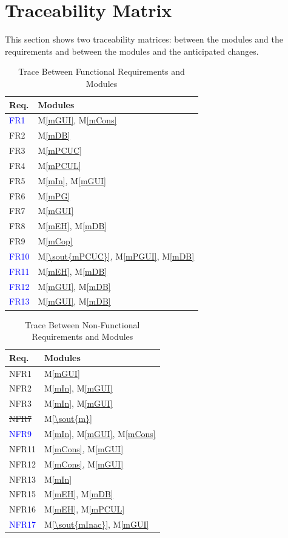 \documentclass[12pt, titlepage]{article}
\newcommand{\mref}[1]{M\ref{#1}}
\begin{document}
\section{Traceability Matrix} \label{SecTM}

This section shows two traceability matrices: between the modules and the
requirements and between the modules and the anticipated changes.

\begin{table}[H]
\centering
\begin{tabular}{p{} p{}}
\toprule
\textbf{Req.} & \textbf{Modules}\\
\midrule
\textcolor{blue}{FR1} & \mref{mGUI}, \mref{mCons}\\
FR2 & \mref{mDB}\\
FR3 & \mref{mPCUC}\\
FR4 & \mref{mPCUL}\\
FR5 & \mref{mIn}, \mref{mGUI}\\
FR6 & \mref{mPG}\\
FR7 & \mref{mGUI}\\
FR8 & \mref{mEH}, \mref{mDB}\\
FR9 & \mref{mCop}\\
\textcolor{blue}{FR10} & \mref{\sout{mPCUC}}, \mref{mPGUI}, \mref{mDB}\\
\textcolor{blue}{FR11} & \mref{mEH}, \mref{mDB}\\
\textcolor{blue}{FR12} & \mref{mGUI}, \mref{mDB}\\
\textcolor{blue}{FR13} & \mref{mGUI}, \mref{mDB}\\
\bottomrule
\end{tabular}
\caption{Trace Between Functional Requirements and Modules}
\label{TblRT}
\end{table}

\begin{table}[H]
\centering
\begin{tabular}{p{} p{}}
\toprule
\textbf{Req.} & \textbf{Modules}\\
\midrule
NFR1 & \mref{mGUI}\\
NFR2 & \mref{mIn}, \mref{mGUI}\\
NFR3 & \mref{mIn}, \mref{mGUI}\\
\sout{NFR7} & \mref{\sout{m}}\\
\textcolor{blue}{NFR9} & \mref{mIn}, \mref{mGUI}, \mref{mCons}\\
NFR11 & \mref{mCons}, \mref{mGUI}\\
NFR12 & \mref{mCons}, \mref{mGUI}\\
NFR13 & \mref{mIn}\\
NFR15 & \mref{mEH}, \mref{mDB}\\
NFR16 & \mref{mEH}, \mref{mPCUL}\\
\textcolor{blue}{NFR17} & \mref{\sout{mInac}}, \mref{mGUI}\\
\bottomrule
\end{tabular}
\caption{Trace Between Non-Functional Requirements and Modules}
\label{TblRT}
\end{table}
\end{document}

